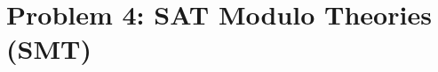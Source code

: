 \section*{Problem 4: SAT Modulo Theories (SMT)}

\newcommand{\SolverSMT}{\todo{Z3}\xspace}  %
\newcommand{\TimeoutSMT}{\todo{60.0}}  %

\newcommand{\SASM}{\textsf{MiniASM}\xspace}
\newcommand{\Instr}[1]{\mathsf{#1}}
\newcommand{\Cmp}[1]{\Instr{cmp}_{#1}}
\newcommand{\Dup}{\Instr{dup}}
\newcommand{\Jmp}[1]{\Instr{jmp}_{#1}}
\newcommand{\Neg}{\Instr{neg}}
\newcommand{\Plus}{\Instr{plus}}
\newcommand{\Pop}{\Instr{pop}}
\newcommand{\Push}[1]{\Instr{push}_{#1}}
\newcommand{\Read}{\Instr{read}}
\newcommand{\Swap}{\Instr{swap}}
\newcommand{\Write}{\Instr{write}}

